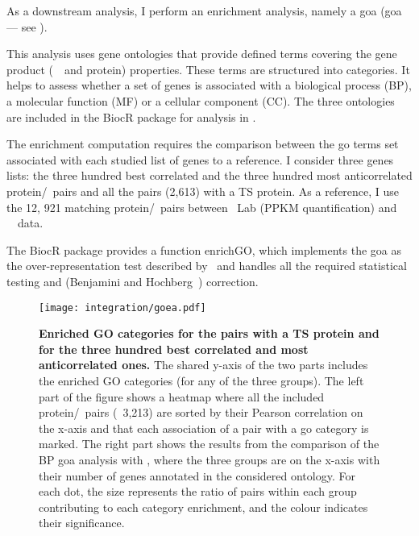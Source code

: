 As a downstream analysis,
I perform an enrichment analysis,
namely a \glsdesc{goa} (\gls{goa} --- see ).

This analysis uses gene ontologies that provide defined terms
covering the gene product (\ie\ \mRNA\ and protein) properties.
These terms are structured into categories.
It helps to assess whether a set of genes is associated with
a biological process (BP), a molecular function (MF) or a cellular component (CC).
The three ontologies are included
in the \gls{BiocR} package 
for analysis in .

The enrichment computation requires
the comparison between the \gls{go} terms set associated
with each studied list of genes to a reference.
I consider three genes lists:
the three hundred best correlated and
the three hundred most anticorrelated protein/\mRNA\ pairs
and all the pairs (2,613) with a \gls{TS} protein.
As a reference, I use the 12, 921 matching protein/\mRNA\ pairs
between \pandey\ Lab (\gls{PPKM} quantification) and \uhlen\ \etal\ data.

The \gls{BiocR} package 
provides a function \textsf{enrichGO},
which implements the \gls{goa} as the over-representation test
described by~\citet{Boyle2004-dh}
and handles all the required statistical testing
and (Benjamini and Hochberg~) correction.

    \begin{sidewaysfigure}
        \texttt{[image: integration/goea.pdf]}\centering
        \vspace{-3mm}
        \caption[Enriched GO categories for the pairs with a TS proteins and for the
        three hundred best correlated and most anticorrelated
        ones]{\label{fig:goares}%
        \textbf{Enriched GO categories for the pairs with a TS protein
        and for the three hundred best correlated
        and most anticorrelated ones.}
        The shared y-axis of the two parts includes the enriched GO categories
        (for any of the three groups).
        The left part of the figure shows
        a heatmap where all the included protein/\mRNA\ pairs (\ie\ 3,213)
        are sorted by their Pearson correlation on the x-axis and
        that each association of a pair with a \gls{go} category is marked.
        The right part shows the results from the comparison
        of the BP \gls{goa} analysis with ,
        where the three groups are on the x-axis with their number of genes
        annotated in the considered ontology.
        For each dot, the size represents the ratio of pairs within each group
        contributing to each category enrichment,
        and the colour indicates their significance.
        }
    \end{sidewaysfigure}


